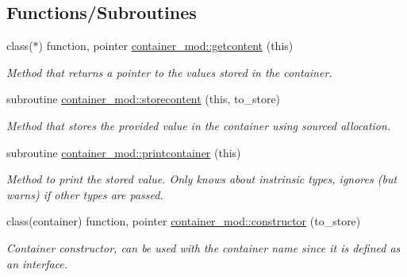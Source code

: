 \subsection*{Functions/\+Subroutines}
\begin{DoxyCompactItemize}
\item 
class($\ast$) function, pointer \hyperlink{namespacecontainer__mod_a23a016e747d896622127c0c21dca9836}{container\+\_\+mod\+::getcontent} (this)
\begin{DoxyCompactList}\small\item\em Method that returns a pointer to the values stored in the container. \end{DoxyCompactList}\item 
subroutine \hyperlink{namespacecontainer__mod_ace49cee012b6cd3c41c03556ab0dd884}{container\+\_\+mod\+::storecontent} (this, to\+\_\+store)
\begin{DoxyCompactList}\small\item\em Method that stores the provided value in the container using sourced allocation. \end{DoxyCompactList}\item 
subroutine \hyperlink{namespacecontainer__mod_abf1785185971a527e437d3a489462724}{container\+\_\+mod\+::printcontainer} (this)
\begin{DoxyCompactList}\small\item\em Method to print the stored value. Only knows about instrinsic types, ignores (but warns) if other types are passed. \end{DoxyCompactList}\item 
class(container) function, pointer \hyperlink{namespacecontainer__mod_a6262df4ff34024d566cf8261dc20a248}{container\+\_\+mod\+::constructor} (to\+\_\+store)
\begin{DoxyCompactList}\small\item\em Container constructor, can be used with the \textquotesingle{}container\textquotesingle{} name since it is defined as an interface. \end{DoxyCompactList}\end{DoxyCompactItemize}

